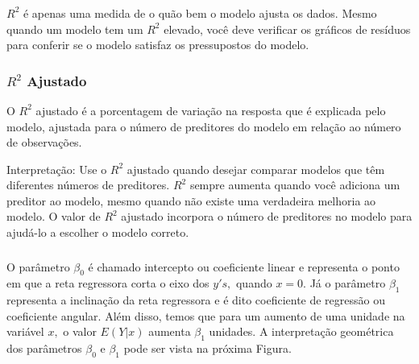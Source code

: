 \documentclass[14pt,aspectratio=1610]{beamer}
\begin{document}
\begin{frame}{}
\frametitle{ }
\begin{block}{}
\justifying
$R^{2}$ é apenas uma medida de o quão bem o modelo ajusta os dados. Mesmo quando um modelo tem um $R^{2}$ elevado, você deve verificar os gráficos de resíduos para conferir se o modelo satisfaz os pressupostos do modelo. 
\end{block}
\end{frame}

\begin{frame}{}
\frametitle{$R^{2}$ Ajustado}
\begin{block}{}
\justifying
O $R^{2}$ ajustado é a porcentagem de variação na resposta que é explicada pelo modelo, ajustada para o número de preditores do modelo em relação ao número de observações. 
\end{block}\pause
\begin{block}{Interpretação:}
\justifying
Use o $R^{2}$ ajustado quando desejar comparar modelos que têm diferentes números de preditores. $R^{2}$ sempre aumenta quando você adiciona um preditor ao modelo, mesmo quando não existe uma verdadeira melhoria ao modelo. O valor de $R^{2}$ ajustado incorpora o número de preditores no modelo para ajudá-lo a escolher o modelo correto. 
\end{block}
\end{frame}

\begin{frame}{}
\frametitle{ }
\begin{block}{}
\justifying
O parâmetro $\beta_0$ é chamado intercepto ou coeficiente linear e representa o ponto em que a reta regressora corta o eixo dos $y's,$ quando $x=0.$ Já o parâmetro $\beta_1$ representa a inclinação da reta regressora e é dito coeficiente de regressão ou coeficiente angular. Além disso, temos que para um aumento de uma unidade na variável $x,$ o valor $E(Y|x)$ aumenta $\beta_1$ unidades. A interpretação geométrica dos parâmetros $\beta_0$ e $\beta_1$ pode ser vista na próxima Figura.
\end{block}
\end{frame}
\end{document}
